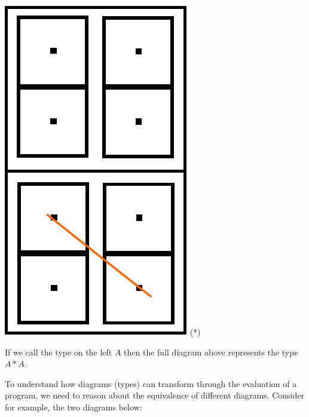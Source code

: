 \documentclass{article}
\begin{document}
\begin{center}
\includegraphics[scale=0.3]{images/tall-tl-2}
\hfill (*)
\end{center}
If we call the type on the left $A$ then the full diagram above
represents the type $A*A$.

To understand how diagrams (types) can transform through the
evaluation of  a program, we need to reason about the equivalence of
different diagrams. Consider for example, the two diagrams below:
\end{document}
